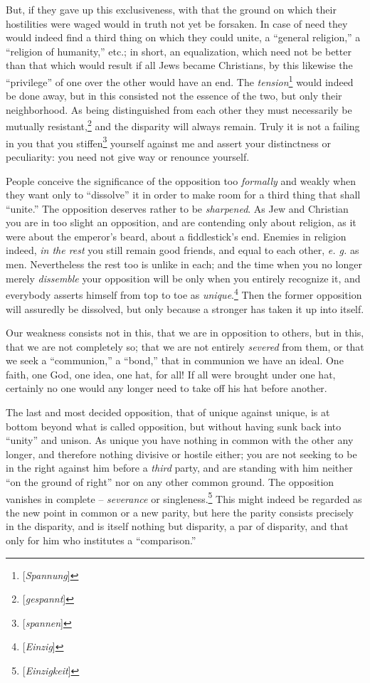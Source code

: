 \documentclass[12pt,a4paper]{book}
\begin{document}
But, if they gave up this exclusiveness, with that the ground on which their 
hostilities were waged would in truth not yet be forsaken. In case of need 
they would indeed find a third thing on which they could unite, a ``general 
religion,'' a ``religion of humanity,'' etc.; in short, an equalization, 
which need not be better than that which would result if all Jews became 
Christians, by this likewise the ``privilege'' of one over the other would 
have an end. The \textit{tension}\footnote{[\textit{Spannung}]} would indeed 
be done away, but in this consisted not the essence of the two, but only their 
neighborhood. As being distinguished from each other they must necessarily be 
mutually resistant,\footnote{[\textit{gespannt}]} and the disparity will 
always remain. Truly it is not a failing in you that you 
stiffen\footnote{[\textit{spannen}]} yourself against me and assert your 
distinctness or peculiarity: you need not give way or renounce yourself.

People conceive the significance of the opposition too \textit{formally} and 
weakly when they want only to ``dissolve'' it in order to make room for a 
third thing that shall ``unite.'' The opposition deserves rather to be 
\textit{sharpened}. As Jew and Christian you are in too slight an opposition, 
and are contending only about religion, as it were about the emperor's beard, 
about a fiddlestick's end. Enemies in religion indeed, \textit{in the rest} 
you still remain good friends, and equal to each other, \textit{e. g.} as men. 
Nevertheless the rest too is unlike in each; and the time when you no longer 
merely \textit{dissemble} your opposition will be only when you entirely 
recognize it, and everybody asserts himself from top to toe as 
\textit{unique}.\footnote{[\textit{Einzig}]} Then the former opposition will 
assuredly be dissolved, but only because a stronger has taken it up into 
itself.

Our weakness consists not in this, that we are in opposition to others, but in 
this, that we are not completely so; that we are not entirely \textit{severed} 
from them, or that we seek a ``communion,'' a ``bond,'' that in communion 
we have an ideal. One faith, one God, one idea, one hat, for all! If all were 
brought under one hat, certainly no one would any longer need to take off his 
hat before another.

The last and most decided opposition, that of unique against unique, is at 
bottom beyond what is called opposition, but without having sunk back into 
``unity'' and unison. As unique you have nothing in common with the other 
any longer, and therefore nothing divisive or hostile either; you are not 
seeking to be in the right against him before a \textit{third} party, and are 
standing with him neither ``on the ground of right'' nor on any other common 
ground. The opposition vanishes in complete -- \textit{severance} or 
singleness.\footnote{[\textit{Einzigkeit}]} This might indeed be regarded as 
the new point in common or a new parity, but here the parity consists 
precisely in the disparity, and is itself nothing but disparity, a par of 
disparity, and that only for him who institutes a ``comparison.''
\end{document}

